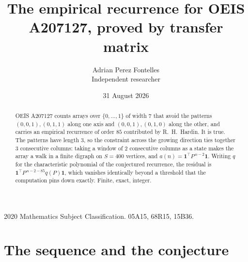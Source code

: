 \documentclass[11pt,a4paper]{article}
\title{The empirical recurrence for OEIS A207127, proved by transfer matrix}
\author{Adrian Perez Fontelles\\ \small Independent researcher}
\date{31 August 2026}
\theoremstyle{plain}
\theoremstyle{definition}
\begin{document}
\maketitle

\begin{abstract}
OEIS A207127 counts arrays over $\{0,\dots,1\}$ of width $7$ that avoid the patterns
$(0,0,1), (0,1,1)$ along one axis and $(0,0,1), (0,1,0)$ along the other, and carries an empirical recurrence of
order $85$ contributed by R.~H.~Hardin. It is true. The patterns have length $3$, so
the constraint across the growing direction ties together $3$ consecutive columns: taking a
window of $2$ consecutive columns as a state makes the array a walk in a finite digraph
on $S=400$ vertices, and $a(n)=\mathbf{1}^{\!\top}P^{\,n-2}\mathbf{1}$. Writing $q$
for the characteristic polynomial of the conjectured recurrence, the residual is
$\mathbf{1}^{\!\top}P^{\,n-2-85}q(P)\mathbf{1}$, which vanishes identically
beyond a threshold that the computation pins down exactly. Finite, exact, integer.
\end{abstract}

\noindent\small 2020 Mathematics Subject Classification. 05A15, 68R15, 15B36.\normalsize

\section{The sequence and the conjecture}
\end{document}
